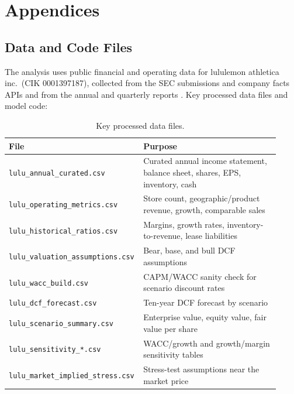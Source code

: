\documentclass[a4paper]{CSMakotoTechnicalReport}
\begin{document}
\newpage
\section*{Appendices}
\begin{appendices}

\section{Data and Code Files}

The analysis uses public financial and operating data for lululemon athletica inc.\ (CIK 0001397187), collected from the SEC submissions and company facts APIs \autocite{secsubmissions,seccompanyfacts} and from the annual and quarterly reports \autocite{lulu10k,lulu10q}. Key processed data files and model code:

\begin{table}[H]
	\caption{Key processed data files.}
	\begin{tabular}{L{0.42\linewidth} L{0.5\linewidth}}
		\toprule
		\textbf{File} & \textbf{Purpose} \\
		\midrule
		\texttt{lulu\_annual\_curated.csv} & Curated annual income statement, balance sheet, shares, EPS, inventory, cash \\
		\texttt{lulu\_operating\_metrics.csv} & Store count, geographic/product revenue, growth, comparable sales \\
		\texttt{lulu\_historical\_ratios.csv} & Margins, growth rates, inventory-to-revenue, lease liabilities \\
		\texttt{lulu\_valuation\_assumptions.csv} & Bear, base, and bull DCF assumptions \\
		\texttt{lulu\_wacc\_build.csv} & CAPM/WACC sanity check for scenario discount rates \\
		\texttt{lulu\_dcf\_forecast.csv} & Ten-year DCF forecast by scenario \\
		\texttt{lulu\_scenario\_summary.csv} & Enterprise value, equity value, fair value per share \\
		\texttt{lulu\_sensitivity\_*.csv} & WACC/growth and growth/margin sensitivity tables \\
		\texttt{lulu\_market\_implied\_stress.csv} & Stress-test assumptions near the market price \\
		\bottomrule
	\end{tabular}
\end{table}


\end{appendices}
\end{document}
